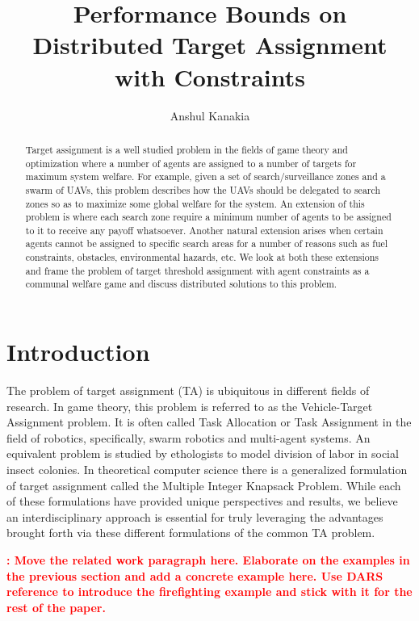 \documentclass[11pt, onecolumn, compsoc, letterpaper]{article}
\title{Performance Bounds on Distributed Target Assignment with Constraints}
\author{Anshul Kanakia}
\date{}
\newcounter{comcount}
\newcommand{\mycomment}[1]
{
\refstepcounter{comcount}
\textcolor{red}{\textbf{\emph{\arabic{comcount}}: \small{#1}}}
}
\begin{document}
\maketitle

\begin{abstract}
Target assignment is a well studied problem in the fields of game theory and optimization where a number of agents are assigned to a number of targets for maximum system welfare. For example, given a set of search/surveillance zones and a swarm of UAVs, this problem describes how the UAVs should be delegated to search zones so as to maximize some global welfare for the system. An extension of this problem is where each search zone require a minimum number of agents to be assigned to it to receive any payoff whatsoever. Another natural extension arises when certain agents cannot be assigned to specific search areas for a number of reasons such as fuel constraints, obstacles, environmental hazards, etc. We look at both these extensions and frame the problem of target threshold assignment with agent constraints as a communal welfare game and discuss distributed solutions to this problem.
\end{abstract}

\section{Introduction}
The problem of target assignment (TA) is ubiquitous in different fields of research. In game theory, this problem is referred to as the Vehicle-Target Assignment problem. It is often called Task Allocation or Task Assignment in the field of robotics, specifically, swarm robotics and multi-agent systems. An equivalent problem is studied by ethologists to model division of labor in social insect colonies. In theoretical computer science there is a generalized formulation of target assignment called the Multiple Integer Knapsack Problem. While each of these formulations have provided unique perspectives and results, we believe an interdisciplinary approach is essential for truly leveraging the advantages brought forth via these different formulations of the common TA problem.

\mycomment{Move the related work paragraph here. Elaborate on the examples in the previous section and add a concrete example here. Use DARS reference to introduce the firefighting example and stick with it for the rest of the paper.}
\end{document}
